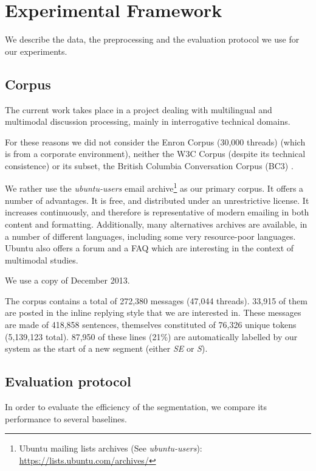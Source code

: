 
\section{Experimental Framework}
\label{sec:experimental_framework}

We describe the data, the preprocessing and the evaluation protocol we use for our experiments.

\subsection{Corpus}

The current work takes place in a project dealing with multilingual and multimodal discussion processing, mainly in interrogative technical domains.

For these reasons we did not consider the Enron Corpus (30,000 threads) \cite{klimt:2004:enron} (which is from a corporate environment), neither the W3C Corpus (despite its technical consistence) or its subset, the British Columbia Conversation Corpus (BC3) \cite{ulrich:2008:bc3}.

We rather use the \textit{ubuntu-users} email archive\footnote{Ubuntu mailing lists archives (See \textit{ubuntu-users}): \url{https://lists.ubuntu.com/archives/}} as our primary corpus. It offers a number of advantages. It is free, and distributed under an unrestrictive license. It increases continuously, and therefore is representative of modern emailing in both content and formatting. Additionally, many alternatives archives are available, in a number of different languages, including some very resource-poor languages. Ubuntu also offers a forum and a FAQ which are interesting in the context of multimodal studies. 

We use a copy of December 2013.

The corpus contains a total of 272,380 messages (47,044 threads). 33,915 of them are posted in the inline replying style that we are interested in. These messages are made of 418,858 sentences, themselves constituted of 76,326 unique tokens (5,139,123 total). 87,950 of these lines (21\%) are automatically labelled by our system as the start of a new segment (either \textit{SE} or \textit{S}).

\subsection{Evaluation protocol}

In order to evaluate the efficiency of the segmentation, we compare its performance to several baselines. 

